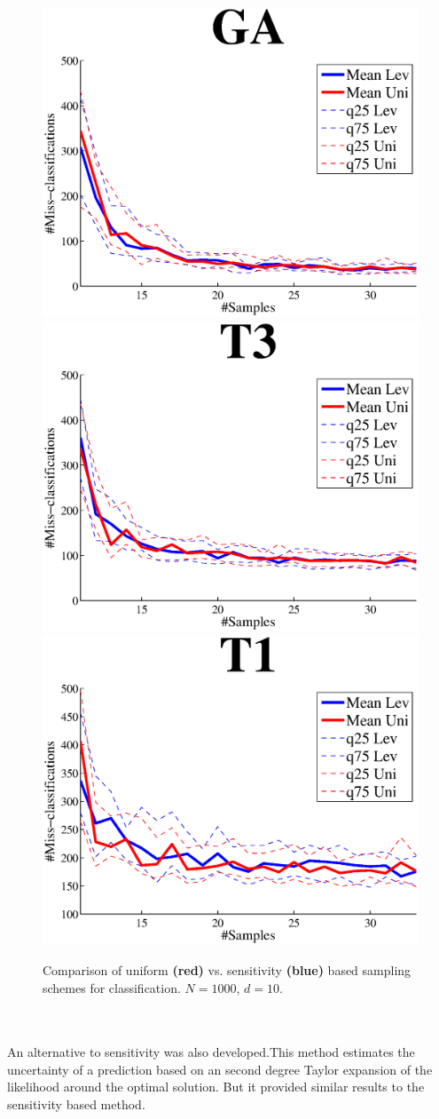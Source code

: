 \documentclass{article}
\begin{document}
    \begin{figure}[!t]
    	\centering
    	\includegraphics[width=.49\linewidth]{images/GAsen.eps}
    	\includegraphics[width=.49\linewidth]{images/T3sen.eps}
    	\includegraphics[width=.49\linewidth]{images/T1sen.eps}
    	\caption{Comparison of uniform {\bf\color{red}(red)} vs. sensitivity {\bf\color{blue}(blue)} based sampling schemes for classification. $N = 1000$, $d = 10$.}
    	\label{fig:SENS_class}
    \end{figure}	
    	
    	

\\
\\
An alternative to sensitivity was also developed.This method estimates the uncertainty of a prediction based on an second degree Taylor expansion of the likelihood around the optimal solution. But it provided similar results to the sensitivity based method.
\end{document}
